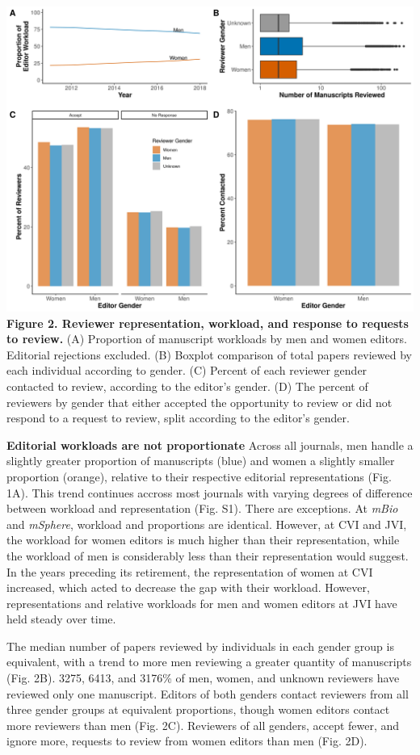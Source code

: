 \documentclass[11pt,]{article}
\begin{document}
\includegraphics{Figure_2.png} \textbf{Figure 2. Reviewer
representation, workload, and response to requests to review.} (A)
Proportion of manuscript workloads by men and women editors. Editorial
rejections excluded. (B) Boxplot comparison of total papers reviewed by
each individual according to gender. (C) Percent of each reviewer gender
contacted to review, according to the editor's gender. (D) The percent
of reviewers by gender that either accepted the opportunity to review or
did not respond to a request to review, split according to the editor's
gender.

\textbf{Editorial workloads are not proportionate} Across all journals,
men handle a slightly greater proportion of manuscripts (blue) and women
a slightly smaller proportion (orange), relative to their respective
editorial representations (Fig. 1A). This trend continues accross most
journals with varying degrees of difference between workload and
representation (Fig. S1). There are exceptions. At \emph{mBio} and
\emph{mSphere}, workload and proportions are identical. However, at CVI
and JVI, the workload for women editors is much higher than their
representation, while the workload of men is considerably less than
their representation would suggest. In the years preceding its
retirement, the representation of women at CVI increased, which acted to
decrease the gap with their workload. However, representations and
relative workloads for men and women editors at JVI have held steady
over time.

The median number of papers reviewed by individuals in each gender group
is equivalent, with a trend to more men reviewing a greater quantity of
manuscripts (Fig. 2B). 3275, 6413, and 3176\% of men, women, and unknown
reviewers have reviewed only one manuscript. Editors of both genders
contact reviewers from all three gender groups at equivalent
proportions, though women editors contact more reviewers than men (Fig.
2C). Reviewers of all genders, accept fewer, and ignore more, requests
to review from women editors than men (Fig. 2D).
\end{document}
